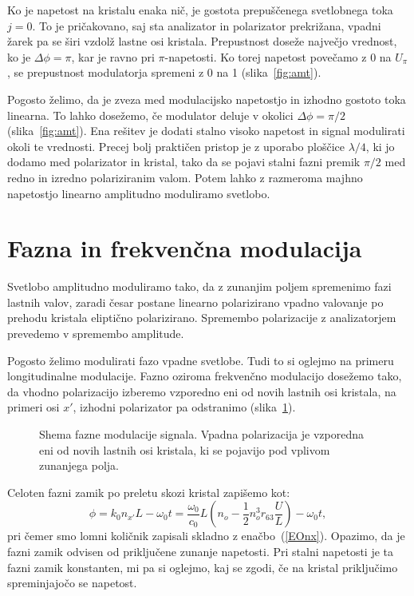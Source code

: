 Ko je napetost na kristalu enaka nič, je gostota prepuščenega svetlobnega toka 
$j=0$. To je pričakovano, saj sta analizator in polarizator prekrižana, 
vpadni žarek pa se širi vzdolž lastne osi kristala.
Prepustnost doseže največjo vrednost, ko je $\Delta \phi=\pi$, kar je ravno pri 
$\pi$-napetosti. Ko torej napetost povečamo z 0 na $U_\pi$, se
prepustnost modulatorja spremeni z 0 na 1 (slika~\ref{fig:amt}).

Pogosto želimo, da je zveza med modulacijsko napetostjo in izhodno
gostoto toka linearna. To lahko dosežemo, če modulator deluje v okolici $\Delta\phi=\pi/2$
(slika~\ref{fig:amt}).
Ena rešitev je dodati stalno visoko napetost in signal modulirati okoli
te vrednosti. Precej bolj praktičen pristop je z uporabo ploščice $\lambda/4$,
ki jo dodamo med polarizator in kristal, tako da se pojavi stalni
fazni premik $\pi/2$ med redno in izredno polariziranim valom. Potem lahko z razmeroma majhno napetostjo
linearno amplitudno moduliramo svetlobo.

\section{Fazna in frekvenčna modulacija}
Svetlobo amplitudno moduliramo tako, da z zunanjim
poljem spremenimo fazi lastnih valov, zaradi česar postane linearno
polarizirano vpadno valovanje po prehodu kristala eliptično polarizirano.
Spremembo polarizacije z analizatorjem prevedemo v spremembo amplitude.

Pogosto želimo modulirati fazo vpadne svetlobe. Tudi to
si oglejmo na primeru longitudinalne
 modulacije. Fazno oziroma 
 frekvenčno modulacijo dosežemo tako,
da vhodno polarizacijo izberemo vzporedno eni od novih lastnih osi kristala, 
na primeri osi $x'$, izhodni polarizator pa odstranimo (slika~\ref{fig:fmshema}). 
\begin{figure}[ht]
\centering
\def\svgwidth{80truemm} 

\caption{Shema fazne modulacije signala. Vpadna polarizacija je vzporedna eni od 
novih lastnih osi kristala, ki se pojavijo pod vplivom zunanjega polja.}
\label{fig:fmshema}
\end{figure}

Celoten fazni zamik po preletu skozi kristal zapišemo kot:
\begin{equation}
\phi =  k_0 n_{x'} L -\omega_0 t= \frac{\omega_0}{c_0}L \left(n_o -
\frac{1}{2}n_o^3 r_{63}\frac{U}{L}\right)-\omega_0 t,
\label{fmphi}
\end{equation}
pri čemer smo lomni količnik zapisali skladno z enačbo~(\ref{EOnx}). Opazimo,
da je fazni zamik odvisen od priključene zunanje napetosti. Pri stalni napetosti je 
ta fazni zamik konstanten, mi pa si oglejmo, kaj se zgodi, če na kristal priključimo
spreminjajočo se napetost.


